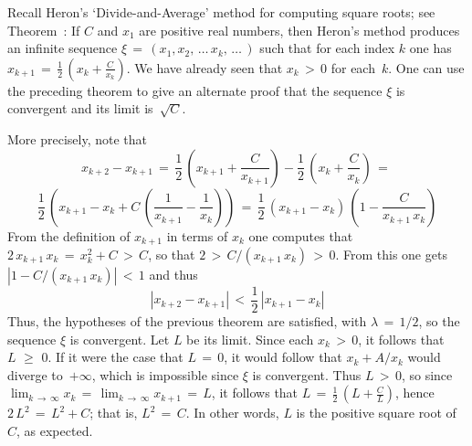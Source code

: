 \V

        Recall Heron's `Divide-and-Average' method for computing square roots; see Theorem~:
    If $C$ and $x_{1}$ are positive real numbers, then Heron's method produces an infinite sequence ${\xi} \,=\, (x_{1}, x_{2},\,{\ldots}\,x_{k},\,{\ldots}\,)$
such that for each index $k$ one has
    ${\displaystyle x_{k+1} \,=\, \frac{1}{2}\,\left(x_{k} + \frac{C}{x_{k}}\right)}$. We have already seen that $x_{k}\,>\,0$ for each~$k$.
    One can use the preceding theorem to give an alternate proof that the sequence ${\xi}$ is convergent and its limit is~$\sqrt{C}$.

        More precisely, note that
        \begin{displaymath}
        x_{k+2} - x_{k+1} \,=\, \frac{1}{2}\,\left(x_{k+1} + \frac{C}{x_{k+1}}\right)
    -
        \frac{1}{2}\,\left(x_{k} + \frac{C}{x_{k}}\right)
     \,=\, 
        \end{displaymath}
        \begin{displaymath}
        \frac{1}{2}\,\left(x_{k+1} - x_{k} + C\,\left(\frac{1}{x_{k+1}} - \frac{1}{x_{k}}\right)\right)
     \,=\, 
        \frac{1}{2}\,(x_{k+1}-x_{k})\,\left(1-\frac{C}{x_{k+1}\,x_{k}}\right)
        \end{displaymath}
    From the definition of $x_{k+1}$ in terms of $x_{k}$ one computes that $2\,x_{k+1}\,x_{k} \,=\, x_{k}^{2} + C\,>\,C$,
    so that $2\,>\,C/(x_{k+1}\,x_{k})\,>\,0$. From this one gets $|1-C/(x_{k+1}\,x_{k})|\,<\,1$ and thus
        \begin{displaymath}
        \left|x_{k+2} - x_{k+1}\right|\,<\,\frac{1}{2}\,\left|x_{k+1}-x_{k}\right|
        \end{displaymath}
    Thus, the hypotheses of the previous theorem are satisfied, with ${\lambda} \,=\, 1/2$, so the sequence ${\xi}$ is convergent.
    Let $L$ be its limit. Since each $x_{k}\,>\,0$, it follows that $L\,\,{\geq}\,\,0$.
    If it were the case that $L \,=\, 0$, it would follow that $x_{k} + A/x_{k}$ would diverge to~$+{\infty}$, which is impossible since ${\xi}$ is convergent.
    Thus $L\,>\,0$, so since $\lim_{k \,{\rightarrow}\, {\infty}} x_{k} \,=\, \lim_{k \,{\rightarrow}\, {\infty}} x_{k+1} \,=\, L$,
    it follows that ${\displaystyle L \,=\, \frac{1}{2}\,\left(L + \frac{C}{L}\right)}$,
    hence $2\,L^{2} \,=\, L^{2} + C$; that is, $L^{2} \,=\, C$. In other words, $L$ is the positive square root of~$C$, as expected.



\VV

